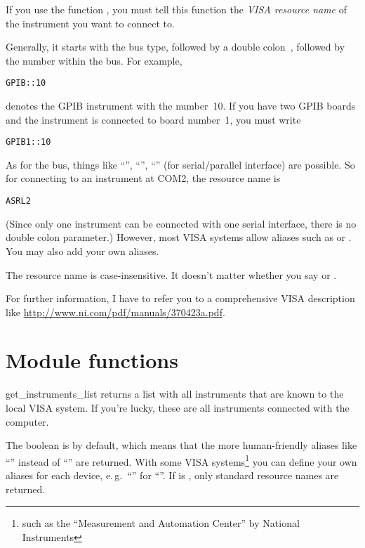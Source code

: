\documentclass{howto}
\begin{document}
If you use the function , you must tell this function
the \emph{VISA resource name} of the instrument you want to connect to.

Generally, it starts with the bus type, followed by a double colon~\samp{::},
followed by the number within the bus.  For example,
\begin{verbatim}
GPIB::10
\end{verbatim}
denotes the GPIB instrument with the number~10.  If you have two GPIB boards
and the instrument is connected to board number~1, you must write
\begin{verbatim}
GPIB1::10
\end{verbatim}

As for the bus, things like ``'', ``'', ``''
(for serial/parallel interface) are possible.  So for connecting to an
instrument at COM2, the resource name is
\begin{verbatim}
ASRL2
\end{verbatim}
(Since only one instrument can be connected with one serial interface, there is
no double colon parameter.)  However, most VISA systems allow aliases such as
 or .  You may also add your own aliases.

The resource name is case-insensitive.  It doesn't matter whether you say
 or .

\begin{raggedright}
For further information, I have to refer you to a comprehensive VISA
description like \url{http://www.ni.com/pdf/manuals/370423a.pdf}.

\end{raggedright}


\section{Module functions}

\begin{funcdesc}{get_instruments_list}{}
  returns a list with all instruments that are known to the local VISA system.
  If you're lucky, these are all instruments connected with the computer.

  The boolean  is  by default, which means that the
  more human-friendly aliases like ``'' instead of ``''
  are returned.  With some VISA systems\footnote{such as the ``Measurement and
    Automation Center'' by National Instruments} you can define your own
  aliases for each device, e.\,g.\ ``'' for
  ``''.  If  is , only
  standard resource names are returned.
\end{funcdesc}
\end{document}
